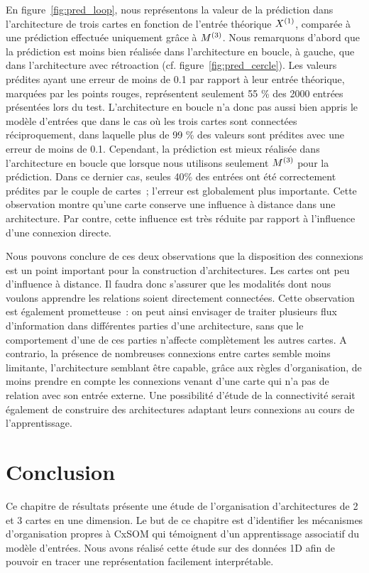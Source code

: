 \documentclass[../main]{subfiles}
\begin{document}
En figure~\ref{fig:pred_loop}, nous représentons la valeur de la prédiction dans l'architecture de trois cartes en fonction de l'entrée théorique $X^{({1})}$, comparée à une prédiction effectuée uniquement grâce à $M^{({3})}$.
Nous remarquons d'abord que la prédiction est moins bien réalisée dans l'architecture en boucle, à gauche, que dans l'architecture avec rétroaction (cf. figure~\ref{fig:pred_cercle}).
Les valeurs prédites ayant une erreur de moins de 0.1 par rapport à leur entrée théorique, marquées par les points rouges, représentent seulement 55 \% des 2000 entrées présentées lors du test.
L'architecture en boucle n'a donc pas aussi bien appris le modèle d'entrées que dans le cas où les trois cartes sont connectées réciproquement, dans laquelle plus de 99 \% des valeurs sont prédites avec une erreur de moins de 0.1.
Cependant, la prédiction est mieux réalisée dans l'architecture en boucle que lorsque nous utilisons seulement $M^{({3})}$ pour la prédiction.
Dans ce dernier cas, seules 40\% des entrées ont été correctement prédites par le couple de cartes~; l'erreur est globalement plus importante.
Cette observation montre qu'une carte conserve une influence à distance dans une architecture. Par contre, cette influence est très réduite par rapport à l'influence d'une connexion directe.

Nous pouvons conclure de ces deux observations que la disposition des connexions est un point important pour la construction d'architectures.
Les cartes ont peu d'influence à distance. Il faudra donc s'assurer que les modalités dont nous voulons apprendre les relations soient directement connectées. Cette observation est également prometteuse~: on peut ainsi envisager de traiter plusieurs flux d'information dans différentes parties d'une architecture, sans que le comportement d'une de ces parties n'affecte complètement les autres cartes.
A contrario, la présence de nombreuses connexions entre cartes semble moins limitante, l'architecture semblant être capable, grâce aux règles d'organisation, de moins prendre en compte les connexions venant d'une carte qui n'a pas de relation avec son entrée externe. 
Une possibilité d'étude de la connectivité serait également de construire des architectures adaptant leurs connexions au cours de l'apprentissage.

\section{Conclusion}

Ce chapitre de résultats présente une étude de l'organisation d'architectures de 2 et 3 cartes en une dimension.
Le but de ce chapitre est d'identifier les mécanismes d'organisation propres à CxSOM qui témoignent d'un apprentissage associatif du modèle d'entrées. Nous avons réalisé cette étude sur des données 1D afin de pouvoir en tracer une représentation facilement interprétable.
\end{document}
